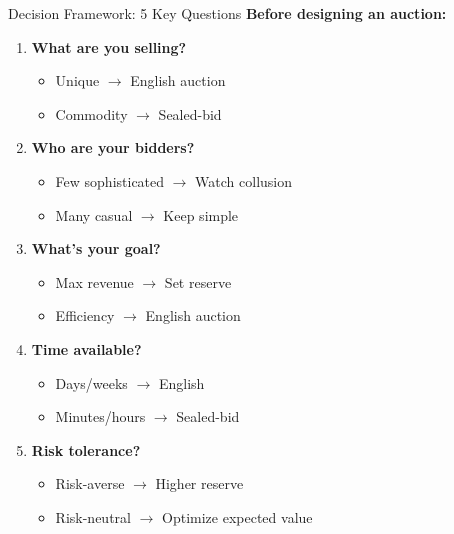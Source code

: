 \documentclass[xcolor={x11names}, aspectratio=169 ]{beamer}
\begin{document}
\begin{frame}{Decision Framework: 5 Key Questions}
\textbf{Before designing an auction:}

\begin{enumerate}
  \item \textbf{What are you selling?}
  \begin{itemize}
    \item Unique $\rightarrow$ English auction
    \item Commodity $\rightarrow$ Sealed-bid
  \end{itemize}
  
  \item \textbf{Who are your bidders?}
  \begin{itemize}
    \item Few sophisticated $\rightarrow$ Watch collusion
    \item Many casual $\rightarrow$ Keep simple
  \end{itemize}
  
  \item \textbf{What's your goal?}
  \begin{itemize}
    \item Max revenue $\rightarrow$ Set reserve
    \item Efficiency $\rightarrow$ English auction
  \end{itemize}
  
  \item \textbf{Time available?}
  \begin{itemize}
    \item Days/weeks $\rightarrow$ English
    \item Minutes/hours $\rightarrow$ Sealed-bid
  \end{itemize}
  
  \item \textbf{Risk tolerance?}
  \begin{itemize}
    \item Risk-averse $\rightarrow$ Higher reserve
    \item Risk-neutral $\rightarrow$ Optimize expected value
  \end{itemize}
\end{enumerate}
\end{frame}
\end{document}
